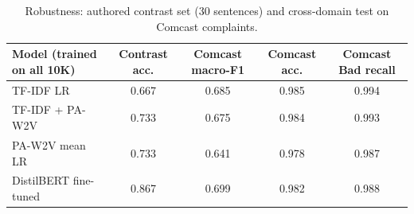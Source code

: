 \begin{table}[H]
\centering
\footnotesize
\caption{Robustness: authored contrast set (30 sentences) and cross-domain test on Comcast complaints.}
\label{tab:robust}
\begin{tabular}{lcccc}
\toprule
Model (trained on all 10K) & Contrast acc. & Comcast macro-F1 & Comcast acc. & Comcast Bad recall \\
\midrule
TF-IDF LR & 0.667 & 0.685 & 0.985 & 0.994 \\
TF-IDF + PA-W2V & 0.733 & 0.675 & 0.984 & 0.993 \\
PA-W2V mean LR & 0.733 & 0.641 & 0.978 & 0.987 \\
DistilBERT fine-tuned & 0.867 & 0.699 & 0.982 & 0.988 \\
\bottomrule
\end{tabular}
\end{table}